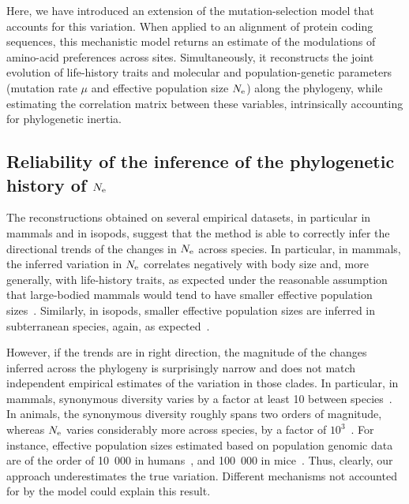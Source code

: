 \documentclass{article}
\begin{document}
Here, we have introduced an extension of the mutation-selection model that accounts for this variation.
When applied to an alignment of protein coding sequences, this mechanistic model returns an estimate of the modulations of amino-acid preferences across sites.
Simultaneously, it reconstructs the joint evolution of life-history traits and molecular and population-genetic parameters (mutation rate $\mu$ and {effective population size} $N_{\text{e}}$) along the phylogeny, while estimating the correlation matrix between these variables, intrinsically accounting for phylogenetic inertia.

\subsection{Reliability of the inference of the phylogenetic history of $N_{\text{e}}$}

The reconstructions obtained on several empirical datasets, in particular in mammals and in isopods, suggest that the method is able to correctly infer the directional trends of the changes in $N_{\text{e}}$ across species.
In particular, in mammals, the inferred variation in $N_{\text{e}}$ correlates negatively with body size and, more generally, with life-history traits, as expected under the reasonable assumption that large-bodied mammals would tend to have smaller effective population sizes~\cite{Popadin2007,Lartillot2012,Nabholz2013,Figuet2017}.
Similarly, in isopods, smaller effective population sizes are inferred in subterranean species, again, as expected~\citep{Capderrey2013}.

However, if the trends are in right direction, the magnitude of the changes inferred across the phylogeny is surprisingly narrow and does not match independent empirical estimates of the variation in those clades.
In particular, in mammals, {synonymous} diversity varies by a factor at least 10 between species~\citep{Galtier2016}.
In animals, the {synonymous} diversity roughly spans two orders of magnitude, whereas $N_{\text{e}}$ varies considerably more across species, by a factor of $10^3$~\citep{Galtier2019}.
For instance, effective population sizes estimated based on population genomic data are of the order of 10~000 in humans~\citep{Li2011}, and 100~000 in mice~\citep{Geraldes2008}.
Thus, clearly, our approach underestimates the true variation.
Different mechanisms not accounted for by the model could explain this result.
\end{document}
